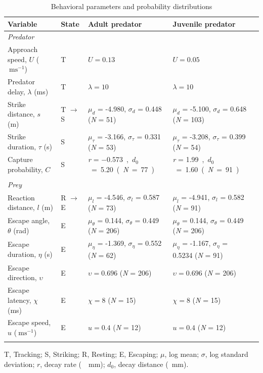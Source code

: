 \documentclass[]{rsos}%
\begin{document}
\begin{table}[!h]
\scriptsize
\caption{Behavioral parameters and probability distributions}%
\begin{tabular}{lllll}%
\hline
Variable &State &Adult predator & Juvenile predator\\
\hline
\textit{Predator}& & & & \\
Approach speed, $U$ ($\SI{}{\m\s} ^{-1}$) &T &$U = 0.13$ & $U = 0.05$ \\
Predator delay, $\lambda$ (ms) &T &$\lambda = 10$ &$\lambda = 10$ \\
Strike distance, $s$ (m) &T $\to$ S &$\mu_d$ = -4.980, $\sigma_d$ = 0.448 (\textit{N} = 51) & $\mu_d$ = -5.100, $\sigma_d$ = 0.648 (\textit{N} = 103)\\
Strike duration, $\tau$ (s) &S &$\mu_{\tau}$ = -3.166, $\sigma_{\tau}$ = 0.331 (\textit{N} = 53) & $\mu_{\tau}$ = -3.208, $\sigma_{\tau}$ = 0.399 (\textit{N} = 54) \\
Capture probability, $C$ &S &\textit{r} = \SI{-0.573}, \textit{$d_0$} = \SI{5.20}  (\textit{N} = 77) &\textit{r} = \SI{1.99}, \textit{$d_0$} = \SI{1.60}  (\textit{N} = 91) \\ \\
\textit{Prey}& & & & \\
Reaction distance, $l$ (m) &R $\to$ E &$\mu_l$ = -4.546, $\sigma_l$ = 0.587 (\textit{N} = 73) &$\mu_l$ = -4.941, $\sigma_l$ = 0.582 (\textit{N} = 91) \\
Escape angle, $\theta$ (rad) &E  &$\mu_{\theta}$ = 0.144, $\sigma_{\theta}$ = 0.449 (\textit{N} = 206) &$\mu_{\theta}$ = 0.144, $\sigma_{\theta}$ = 0.449 (\textit{N} = 206) \\
Escape duration, $\eta$ (s) &E &$\mu_{\eta}$ = -1.369, $\sigma_{\eta}$ = 0.552 (\textit{N} = 62) &$\mu_{\eta}$ = -1.167, $\sigma_{\eta}$ = 0.5234 (\textit{N} = 91) \\
Escape direction, $\upsilon$ &E &$\upsilon=0.696$ (\textit{N} = 206) &$\upsilon=0.696$ (\textit{N} = 206) \\
Escape latency, $\chi$ (ms) &E &$\chi = 8$ (\textit{N} = 15) & $\chi = 8$ (\textit{N} = 15)\\
Escape speed, $u$ ($\SI{}{\m\s} ^{-1}$) &E  &$u = 0.4$ (\textit{N} = 12) &$u = 0.4$ (\textit{N} = 12) \\\hline
\label{table}
\end{tabular}

T, Tracking; S, Striking; R, Resting; E, Escaping; $\mu$, log mean; $\sigma$, log standard deviation; $r$, decay rate (\SI{}{\per\mm}); $d_0$, decay distance (\SI{}{\mm}).
\end{table}%
\end{document}

